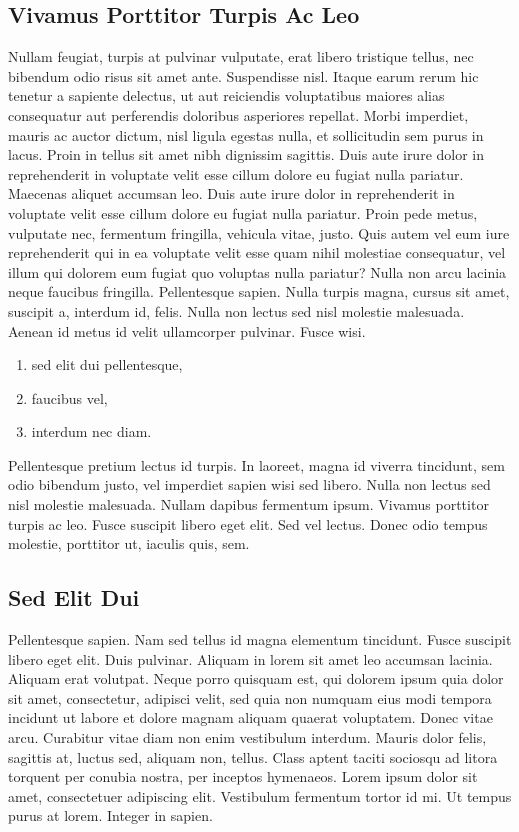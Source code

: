 \subsection{Vivamus Porttitor Turpis Ac Leo}
Nullam feugiat, turpis at pulvinar vulputate, erat libero tristique tellus, nec bibendum odio risus sit amet ante. Suspendisse nisl. Itaque earum rerum hic tenetur a sapiente delectus, ut aut reiciendis voluptatibus maiores alias consequatur aut perferendis doloribus asperiores repellat. Morbi imperdiet, mauris ac auctor dictum, nisl ligula egestas nulla, et sollicitudin sem purus in lacus. Proin in tellus sit amet nibh dignissim sagittis. Duis aute irure dolor in reprehenderit in voluptate velit esse cillum dolore eu fugiat nulla pariatur. Maecenas aliquet accumsan leo. Duis aute irure dolor in reprehenderit in voluptate velit esse cillum dolore eu fugiat nulla pariatur. Proin pede metus, vulputate nec, fermentum fringilla, vehicula vitae, justo. Quis autem vel eum iure reprehenderit qui in ea voluptate velit esse quam nihil molestiae consequatur, vel illum qui dolorem eum fugiat quo voluptas nulla pariatur? Nulla non arcu lacinia neque faucibus fringilla. Pellentesque sapien. Nulla turpis magna, cursus sit amet, suscipit a, interdum id, felis. Nulla non lectus sed nisl molestie malesuada. Aenean id metus id velit ullamcorper pulvinar. Fusce wisi.

\begin{enumerate}
	\item sed elit dui pellentesque,
	\item faucibus vel,
	\item interdum nec diam.
\end{enumerate}
Pellentesque pretium lectus id turpis. In laoreet, magna id viverra tincidunt, sem odio bibendum justo, vel imperdiet sapien wisi sed libero. Nulla non lectus sed nisl molestie malesuada. Nullam dapibus fermentum ipsum. Vivamus porttitor turpis ac leo. Fusce suscipit libero eget elit. Sed vel lectus. Donec odio tempus molestie, porttitor ut, iaculis quis, sem.

\subsection{Sed Elit Dui}
Pellentesque sapien. Nam sed tellus id magna elementum tincidunt. Fusce suscipit libero eget elit. Duis pulvinar. Aliquam in lorem sit amet leo accumsan lacinia. Aliquam erat volutpat. Neque porro quisquam est, qui dolorem ipsum quia dolor sit amet, consectetur, adipisci velit, sed quia non numquam eius modi tempora incidunt ut labore et dolore magnam aliquam quaerat voluptatem. Donec vitae arcu. Curabitur vitae diam non enim vestibulum interdum. Mauris dolor felis, sagittis at, luctus sed, aliquam non, tellus. Class aptent taciti sociosqu ad litora torquent per conubia nostra, per inceptos hymenaeos. Lorem ipsum dolor sit amet, consectetuer adipiscing elit. Vestibulum fermentum tortor id mi. Ut tempus purus at lorem. Integer in sapien.

